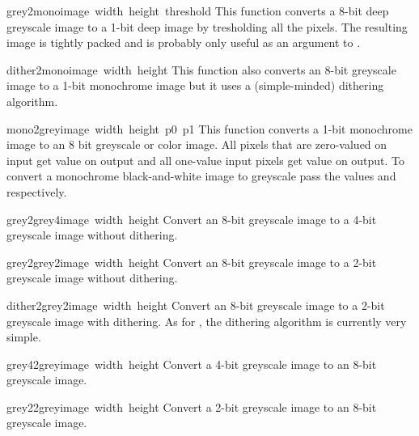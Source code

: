 \begin{funcdesc}{grey2mono}{image\, width\, height\, threshold}
This function converts a 8-bit deep greyscale image to a 1-bit deep
image by tresholding all the pixels. The resulting image is tightly
packed and is probably only useful as an argument to .
\end{funcdesc}

\begin{funcdesc}{dither2mono}{image\, width\, height}
This function also converts an 8-bit greyscale image to a 1-bit
monochrome image but it uses a (simple-minded) dithering algorithm.
\end{funcdesc}

\begin{funcdesc}{mono2grey}{image\, width\, height\, p0\, p1}
This function converts a 1-bit monochrome image to an 8 bit greyscale
or color image. All pixels that are zero-valued on input get value
 on output and all one-value input pixels get value 
on output. To convert a monochrome black-and-white image to greyscale
pass the values  and  respectively.
\end{funcdesc}

\begin{funcdesc}{grey2grey4}{image\, width\, height}
Convert an 8-bit greyscale image to a 4-bit greyscale image without
dithering.
\end{funcdesc}

\begin{funcdesc}{grey2grey2}{image\, width\, height}
Convert an 8-bit greyscale image to a 2-bit greyscale image without
dithering.
\end{funcdesc}

\begin{funcdesc}{dither2grey2}{image\, width\, height}
Convert an 8-bit greyscale image to a 2-bit greyscale image with
dithering. As for , the dithering algorithm is
currently very simple.
\end{funcdesc}

\begin{funcdesc}{grey42grey}{image\, width\, height}
Convert a 4-bit greyscale image to an 8-bit greyscale image.
\end{funcdesc}

\begin{funcdesc}{grey22grey}{image\, width\, height}
Convert a 2-bit greyscale image to an 8-bit greyscale image.
\end{funcdesc}
